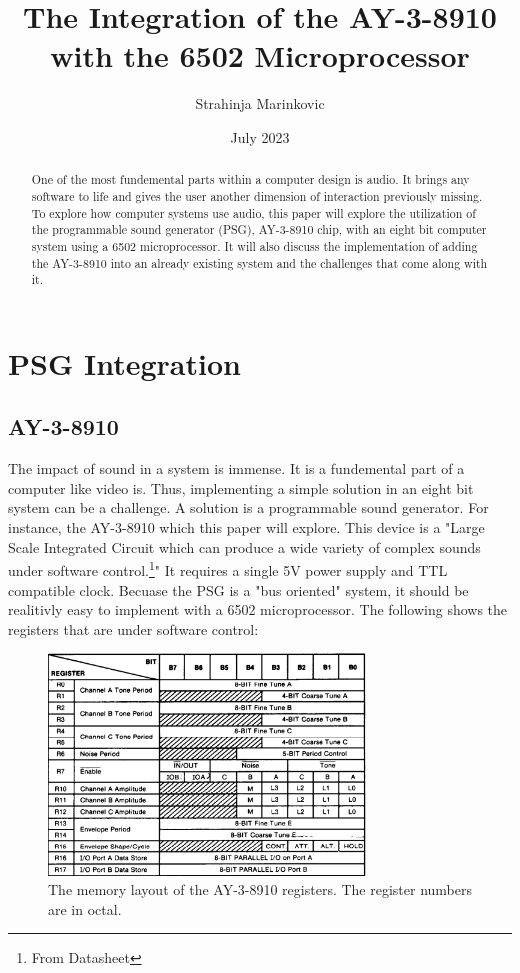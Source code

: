 \documentclass[12pt, letterpaper]{article}
\title{The Integration of the AY-3-8910 with the 6502 Microprocessor}
\author{Strahinja Marinkovic}
\date{July 2023}
\begin{document}
\maketitle

\begin{abstract}
One of the most fundemental parts within a computer design is audio. It brings any software to life
and gives the user another dimension of interaction previously missing. To explore how computer systems
use audio, this paper will explore the utilization of the programmable sound generator (PSG), AY-3-8910 chip, with an eight bit computer system using a 6502 microprocessor. It will also discuss the implementation of adding the AY-3-8910 into an already existing system and the challenges that come along with it. 
\end{abstract}

\newpage

\section{PSG Integration}
\subsection{AY-3-8910}
The impact of sound in a system is immense. It is a fundemental part of a computer like video is. Thus, implementing
a simple solution in an eight bit system can be a challenge. A solution is a programmable sound generator. For instance,
the AY-3-8910 which this paper will explore. This device is a "Large Scale Integrated Circuit which can produce a wide variety of complex sounds under software control.\footnote{From Datasheet}" It requires a single 5V power supply and TTL compatible clock. Becuase the PSG is a "bus oriented" system, it should be realitivly easy to implement with a 6502 microprocessor. The following shows the registers that are under software control:

\begin{figure}[h]
    \includegraphics[width=0.75\textwidth, center]{psg_register_array}
    \caption{The memory layout of the AY-3-8910 registers. The register numbers are in octal.}
    \label{fig:registers_figure}
\end{figure}
\end{document}
